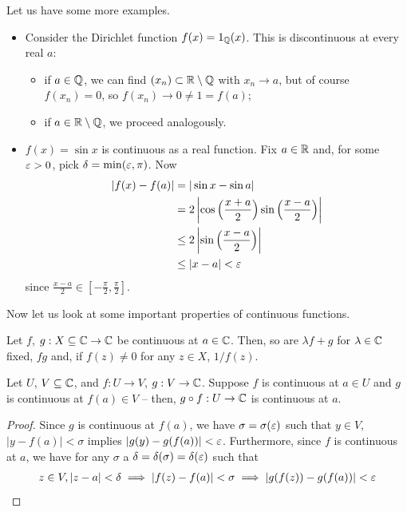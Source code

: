 \documentclass{../../template/note}
\begin{document}
    \begin{example*}
        Let us have some more examples.
        \begin{itemize}
            \item Consider the Dirichlet function \(f(x) = 1_\mathbb Q(x)\). This is discontinuous at every real \(a\):
            \begin{itemize}
                \item if \(a \in \mathbb Q\), we can find \((x_n) \subset \mathbb R \setminus \mathbb Q\) with \(x_n \to a\), but of course \(f(x_n) = 0\), so \(f(x_n) \to 0 \neq 1 = f(a)\);
                \item if \(a \in \mathbb R \setminus \mathbb Q\), we proceed analogously.
            \end{itemize}
            \item \(f(x) = \sin x\) is continuous as a real function. Fix \(a \in \mathbb R\) and, for some \(\varepsilon > 0\), pick \(\delta = \min(\varepsilon, \pi)\). Now
            \begin{align*}
                |f(x)-f(a)| &= |\sin x - \sin a| \\
                &= 2\left|\cos\left(\frac{x+a}2\right)\sin\left(\frac{x-a}2\right)\right| \\
                &\leq 2\left|\sin\left(\frac{x-a}2\right)\right| \\
                &\leq |x-a| < \varepsilon
            \end{align*}
            since \(\frac{x-a}{2} \in \left[-\frac \pi 2, \frac \pi 2\right]\).
        \end{itemize}
    \end{example*}
    
    Now let us look at some important properties of continuous functions.    

    \begin{lemma}
        Let \(f\), \(g: X \subseteq \mathbb C \to \mathbb C\) be continuous at \(a \in \mathbb C\). Then, so are \(\lambda f + g\) for \(\lambda \in \mathbb C\) fixed, \(fg\) and, if \(f(z) \neq 0\) for any \(z \in X\), \(1/f(z)\).
    \end{lemma}
    
    \begin{lemma}
        Let \(U\), \(V \subseteq \mathbb C\), and \(f: U \to V\), \(g: V \to \mathbb C\). Suppose \(f\) is continuous at \(a \in U\) and \(g\) is continuous at \(f(a) \in V\) -- then, \(g \circ f: U \to \mathbb C\) is continuous at \(a\).
    \end{lemma}
    
    \begin{proof}
        Since \(g\) is continuous at \(f(a)\), we have \(\sigma = \sigma(\varepsilon)\) such that \(y \in V\), \(|y-f(a)| < \sigma\) implies \(|g(y) - g(f(a))| < \varepsilon\). Furthermore, since \(f\) is continuous at \(a\), we have for any \(\sigma\) a \(\delta = \delta(\sigma) = \delta(\varepsilon)\) such that
        \begin{align*}
            z \in V, |z-a| < \delta \implies |f(z) - f(a)| < \sigma \implies |g(f(z)) - g(f(a))| < \varepsilon
        \end{align*}
    \end{proof}
    
\end{document}
